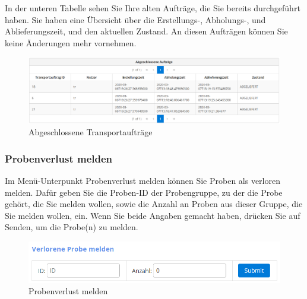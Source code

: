 \documentclass[enabledeprecatedfontcommands,fontsize=12pt,paper=a4,twoside]{scrartcl}
\begin{document}
In der unteren Tabelle sehen Sie Ihre alten Aufträge, die Sie bereits durchgeführt haben. Sie haben eine Übersicht über die Erstellungs-, Abholungs-, und Ablieferungszeit, und den aktuellen Zustand. An diesen Aufträgen können Sie keine Änderungen mehr vornehmen. \\

\begin{figure}[h!]
\begin{center}
 \includegraphics[width=\textwidth]{screenshots/tr/abgeschlossen.png}
  \caption{Abgeschlossene Transportaufträge}
  \label{fig:boat2}
\end{center}
\end{figure}


\subsubsection{Probenverlust melden}
Im Menü-Unterpunkt Probenverlust melden können Sie Proben als verloren melden. Dafür geben Sie die Proben-ID der Probengruppe, zu der die Probe gehört, die Sie melden wollen, sowie die Anzahl an Proben aus dieser Gruppe, die Sie melden wollen, ein. Wenn Sie beide Angaben gemacht haben, drücken Sie auf Senden, um die Probe(n) zu melden. \\

\begin{figure}[h!]
\begin{center}
 \includegraphics[width=\textwidth]{screenshots/tr/verloren.png}
  \caption{Probenverlust melden}
  \label{fig:boat2}
\end{center}
\end{figure}
\end{document}
